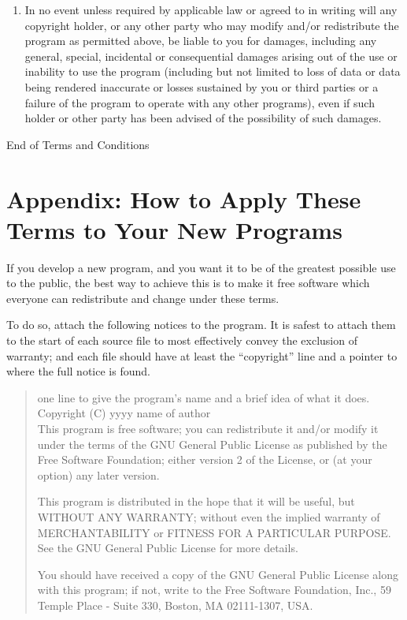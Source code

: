 \documentclass{article}
\begin{document}
\begin{enumerate}
\item
{\sc In no event unless required by applicable law or agreed to in writing
will any copyright holder, or any other party who may modify and/or
redistribute the program as permitted above, be liable to you for damages,
including any general, special, incidental or consequential damages arising
out of the use or inability to use the program (including but not limited
to loss of data or data being rendered inaccurate or losses sustained by
you or third parties or a failure of the program to operate with any other
programs), even if such holder or other party has been advised of the
possibility of such damages.}

\end{enumerate}


\begin{center}
{\Large\sc End of Terms and Conditions}
\end{center}


\pagebreak[2]

\section*{Appendix: How to Apply These Terms to Your New Programs}

If you develop a new program, and you want it to be of the greatest
possible use to the public, the best way to achieve this is to make it
free software which everyone can redistribute and change under these
terms.

  To do so, attach the following notices to the program.  It is safest to
  attach them to the start of each source file to most effectively convey
  the exclusion of warranty; and each file should have at least the
  ``copyright'' line and a pointer to where the full notice is found.

\begin{quote}
one line to give the program's name and a brief idea of what it does. \\
Copyright (C) yyyy  name of author \\

This program is free software; you can redistribute it and/or modify
it under the terms of the GNU General Public License as published by
the Free Software Foundation; either version 2 of the License, or
(at your option) any later version.

This program is distributed in the hope that it will be useful,
but WITHOUT ANY WARRANTY; without even the implied warranty of
MERCHANTABILITY or FITNESS FOR A PARTICULAR PURPOSE.  See the
GNU General Public License for more details.

You should have received a copy of the GNU General Public License
along with this program; if not, write to the Free Software
Foundation, Inc., 59 Temple Place - Suite 330, Boston, MA  02111-1307, USA.
\end{quote}
\end{document}
